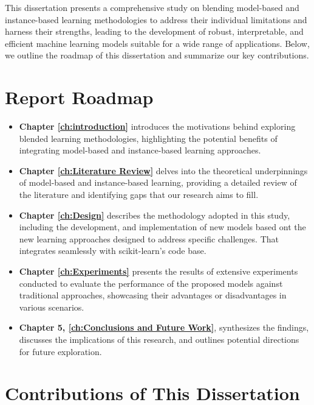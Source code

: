 \documentclass[a4paper, 12pt]{report}
\begin{document}
This dissertation presents a comprehensive study on blending model-based and instance-based learning methodologies to address their individual limitations and harness their strengths, leading to the development of robust, interpretable, and efficient machine learning models suitable for a wide range of applications. Below, we outline the roadmap of this dissertation and summarize our key contributions.

\section{Report Roadmap}

\begin{itemize}
    \item \textbf{Chapter \ref{ch:introduction}} introduces the motivations behind exploring blended learning methodologies, highlighting the potential benefits 
    of integrating model-based and instance-based learning approaches.
    
    \item \textbf{Chapter \ref{ch:Literature Review}} delves into the theoretical underpinnings of model-based and instance-based learning, 
    providing a detailed review of the literature and identifying gaps that our research aims to fill.
    
    \item \textbf{Chapter \ref{ch:Design}} describes the methodology adopted in this study, including the development, and 
    implementation of new models based ont the new learning approaches designed to address specific challenges. That integrates seamlessly with 
    scikit-learn's code base.
    
    \item \textbf{Chapter \ref{ch:Experiments}} presents the results of extensive experiments conducted to evaluate the performance of the proposed models against traditional 
    approaches, showcasing their advantages or disadvantages in various scenarios.
    
    \item \textbf{Chapter 5, \ref{ch:Conclusions and Future Work}}, synthesizes the findings, discusses the implications of this research, and outlines potential 
    directions for future exploration.
\end{itemize}

\section{Contributions of This Dissertation}
\end{document}
